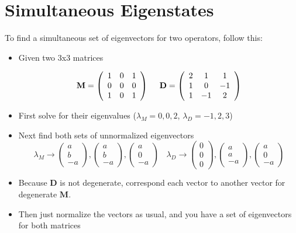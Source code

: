 \section{Simultaneous Eigenstates}
To find a simultaneous set of eigenvectors for two operators, follow this:
\begin{itemize}
\item Given two 3x3 matrices

$$\bf{M} = 
\left(
{\begin{array}{ccc}
1&0&1\\
0&0&0\\
1&0&1\\
\end{array}}
\right)
~~~~\bf{D} = 
\left(
{\begin{array}{ccc}
2&1&1\\
1&0&-1\\
1&-1&2\\
\end{array}}
\right)$$

\item First solve for their eigenvalues ($\lambda_M = 0,0,2$, $\lambda_D = -1,2,3$)
\item Next find both sets of unnormalized eigenvectors
$$
\lambda_M\rightarrow  
\left(
{\begin{array}{c}
a\\
b\\
-a
\end{array}}
\right),
\left(
{\begin{array}{c}
a\\
b\\
-a
\end{array}}
\right),
\left(
{\begin{array}{c}
a\\
0\\
-a
\end{array}}
\right)~~~~
\lambda_D\rightarrow
\left(
{\begin{array}{c}
0\\
0\\
0
\end{array}}
\right),\left(
{\begin{array}{c}
a\\
a\\
-a
\end{array}}
\right),
\left(
{\begin{array}{c}
a\\
0\\
-a
\end{array}}
\right)$$
\item Because $\textbf{D}$ is not degenerate, correspond each vector to another vector for degenerate $\textbf{M}$. 
\item Then just normalize the vectors as usual, and you have a set of eigenvectors for both matrices
\end{itemize}

